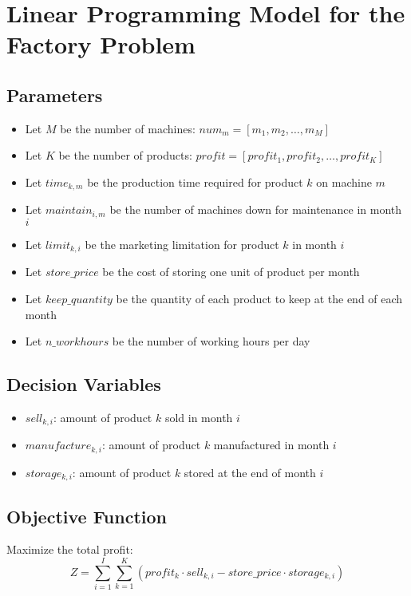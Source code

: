 \documentclass{article}
\begin{document}
\section*{Linear Programming Model for the Factory Problem}

\subsection*{Parameters}
\begin{itemize}
    \item Let $M$ be the number of machines: $num_m = [m_1, m_2, \ldots, m_M]$
    \item Let $K$ be the number of products: $profit = [profit_1, profit_2, \ldots, profit_K]$
    \item Let $time_{k,m}$ be the production time required for product $k$ on machine $m$
    \item Let $maintain_{i,m}$ be the number of machines down for maintenance in month $i$
    \item Let $limit_{k,i}$ be the marketing limitation for product $k$ in month $i$
    \item Let $store\_price$ be the cost of storing one unit of product per month
    \item Let $keep\_quantity$ be the quantity of each product to keep at the end of each month
    \item Let $n\_workhours$ be the number of working hours per day
\end{itemize}

\subsection*{Decision Variables}
\begin{itemize}
    \item $sell_{k,i}$: amount of product $k$ sold in month $i$
    \item $manufacture_{k,i}$: amount of product $k$ manufactured in month $i$
    \item $storage_{k,i}$: amount of product $k$ stored at the end of month $i$
\end{itemize}

\subsection*{Objective Function}
Maximize the total profit:
\[
Z = \sum_{i=1}^{I} \sum_{k=1}^{K} \left( profit_k \cdot sell_{k,i} - store\_price \cdot storage_{k,i} \right)
\]
\end{document}
